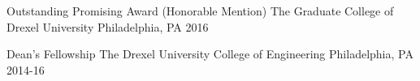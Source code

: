 \begin{cvhonors}
  \cvhonor
    {Outstanding Promising Award (Honorable Mention)} %
    {The Graduate College of Drexel University} %
    {Philadelphia, PA} %
    {2016} %
    

  \cvhonor
    {Dean's Fellowship} %
    {The Drexel University College of Engineering} %
    {Philadelphia, PA} %
    {2014-16} %
    

\end{cvhonors}

